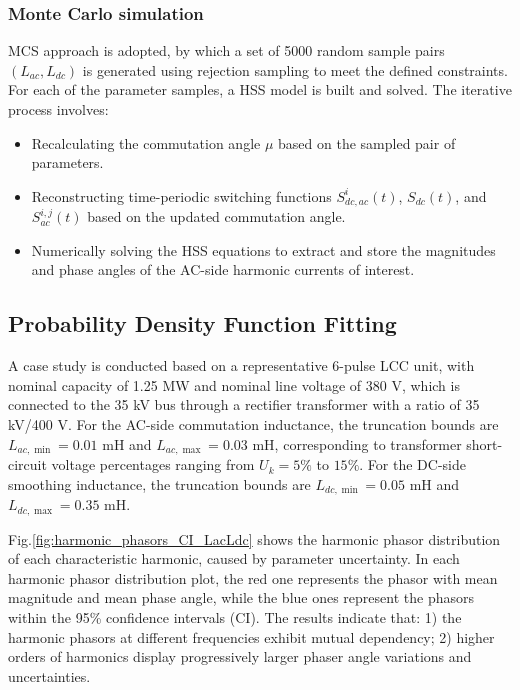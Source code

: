 \subsubsection{Monte Carlo simulation}
MCS approach is adopted, by which a set of 5000 random sample pairs $(L_{ac}, L_{dc})$ is generated using rejection sampling to meet the defined constraints. For each of the parameter samples, a HSS model is built and solved. The iterative process involves:
\begin{itemize}
    \item Recalculating the commutation angle $\mathsf{\mu}$ based on the sampled pair of parameters.
    \item Reconstructing time-periodic switching functions $S_{dc,ac}^{i}(t)$, $S_{dc}(t)$, and $S_{ac}^{i,j}(t)$ based on the updated commutation angle.
    \item Numerically solving the HSS equations to extract and store the magnitudes and phase angles of the AC-side harmonic currents of interest.
\end{itemize}

\subsection{Probability Density Function Fitting}
A case study is conducted based on a representative 6-pulse LCC unit, with nominal capacity of 1.25 MW and nominal line voltage of 380 V, which is connected to the 35 kV bus through a rectifier transformer with a ratio of 35 kV/400 V. 
For the AC-side commutation inductance, the truncation bounds are $L_{ac,\min} = 0.01$ mH and $L_{ac,\max} = 0.03$ mH, corresponding to transformer short-circuit voltage percentages ranging from $U_k = 5\%$ to $15\%$. For the DC-side smoothing inductance, the truncation bounds are $L_{dc,\min} = 0.05$ mH and $L_{dc,\max} = 0.35$ mH.

Fig.\ref{fig:harmonic_phasors_CI_LacLdc} shows the harmonic phasor distribution of each characteristic harmonic, caused by parameter uncertainty. In each harmonic phasor distribution plot, the red one represents the phasor with mean magnitude and mean phase angle, while the blue ones represent the phasors within the 95\% confidence intervals (CI). The results indicate that: 1) the harmonic phasors at different frequencies exhibit mutual dependency; 2) higher orders of harmonics display progressively larger phaser angle variations and uncertainties.

